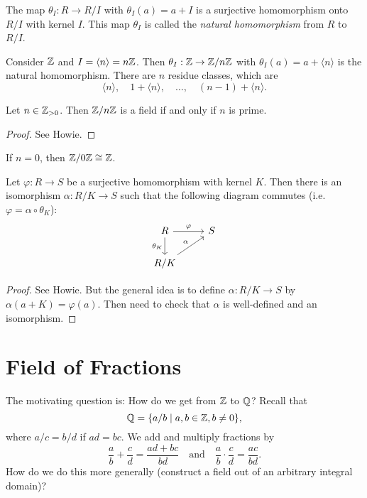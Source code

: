 \begin{exercise}
  The map $\theta_{I} : R \to R / I$ with
  $\theta_I(a) = a + I$ is a surjective homomorphism
  onto $R / I$ with kernel $I$. This map $\theta_I$ is
  called the \emph{natural homomorphism} from
  $R$ to $R / I$.
\end{exercise}

\begin{example}
  Consider $\mathbb{Z}$ and $I = \langle n \rangle = n \mathbb{Z}$.
  Then $\theta_I : \mathbb{Z} \to \mathbb{Z} / n \mathbb{Z}$ with
  $\theta_I(a) = a + \langle n \rangle$ is the
  natural homomorphism. There are $n$ residue classes,
  which are
  \[\langle n \rangle, \quad 1 + \langle n \rangle, \quad \dots, \quad (n - 1) + \langle n \rangle.\]
\end{example}

\begin{theorem}
  Let $n \in \mathbb{Z}_{> 0}$. Then $\mathbb{Z} / n \mathbb{Z}$ is a field
  if and only if $n$ is prime.
\end{theorem}

\begin{proof}
  See Howie.
\end{proof}

\begin{remark}
  If $n = 0$, then $\mathbb{Z} / 0 \mathbb{Z} \cong \mathbb{Z}$.
\end{remark}

\begin{theorem}
  Let $\varphi : R \to S$ be a surjective homomorphism
  with kernel $K$. Then there is an isomorphism
  $\alpha : R / K \to S$ such that the following diagram
  commutes (i.e. $\varphi = \alpha \circ \theta_K$):
  \[
    \begin{tikzcd}
      R \arrow{r}{\varphi} \arrow[swap]{d}{\theta_K}
      & S \\
      R / K \arrow{ur}{\alpha}
    \end{tikzcd}
  \]
\end{theorem}

\begin{proof}
  See Howie. But the general idea is to define
  $\alpha : R / K \to S$ by $\alpha(a + K) = \varphi(a)$.
  Then need to check that $\alpha$ is well-defined
  and an isomorphism.
\end{proof}

\section{Field of Fractions}
The motivating question is: How do we get from
$\mathbb{Z}$ to $\mathbb{Q}$? Recall that
\[\mathbb{Q} = \{a / b \mid a, b \in \mathbb{Z}, b \ne 0\},\]
where $a / c = b / d$ if $ad = bc$. We add and multiply
fractions by
\[
  \frac{a}{b} + \frac{c}{d} = \frac{ad + bc}{bd} \quad
  \text{and} \quad
  \frac{a}{b} \cdot \frac{c}{d} = \frac{ac}{bd}.
\]
How do we do this more generally (construct a field out
of an arbitrary integral domain)?

